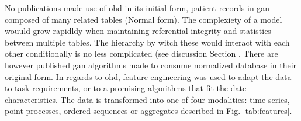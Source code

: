     No publications made use of \gls{ohd} in its initial form, patient records in \gls{gan} composed of many related tables (Normal form). The complexiety of a model wouuld grow rapidldy when maintaining referential integrity and statistics between multiple tables. The hierarchy by witch these would interact with each other conditionally is no less complicated (see discussion Section . There are however published \gls{gan} algorithms made to consume normalized database in their original form. \todo In regards to \gls{ohd}, feature engineering was used to adapt the data to task requirements, or to a promising algorithms that fit the date characteristics. The data is transformed into one of four modalities: time series, point-processes, ordered sequences or aggregates described in Fig. \ref{tab:features}.
    
